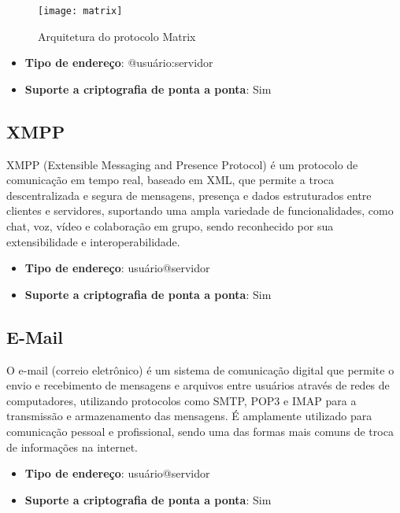 \begin{figure}
  \centering
  \texttt{[image: matrix]}

  \caption{Arquitetura do protocolo Matrix \cite{matrixspec}}
\end{figure}

\begin{itemize}
  \item \textbf{Tipo de endereço}: @usuário:servidor
  \item \textbf{Suporte a criptografia de ponta a ponta}: Sim
\end{itemize}

\subsection{XMPP}

XMPP (Extensible Messaging and Presence Protocol) é um protocolo de comunicação em tempo real, baseado em XML, que permite a troca descentralizada e segura de mensagens, presença e dados estruturados entre clientes e servidores, suportando uma ampla variedade de funcionalidades, como chat, voz, vídeo e colaboração em grupo, sendo reconhecido por sua extensibilidade e interoperabilidade. \cite{xmppspec}

\begin{itemize}
  \item \textbf{Tipo de endereço}: usuário@servidor
  \item \textbf{Suporte a criptografia de ponta a ponta}: Sim
\end{itemize}

\subsection{E-Mail}

O e-mail (correio eletrônico) é um sistema de comunicação digital que permite o envio e recebimento de mensagens e arquivos entre usuários através de redes de computadores, utilizando protocolos como SMTP, POP3 e IMAP para a transmissão e armazenamento das mensagens. É amplamente utilizado para comunicação pessoal e profissional, sendo uma das formas mais comuns de troca de informações na internet. \cite{rfc5321}

\begin{itemize}
  \item \textbf{Tipo de endereço}: usuário@servidor
  \item \textbf{Suporte a criptografia de ponta a ponta}: Sim
\end{itemize}

